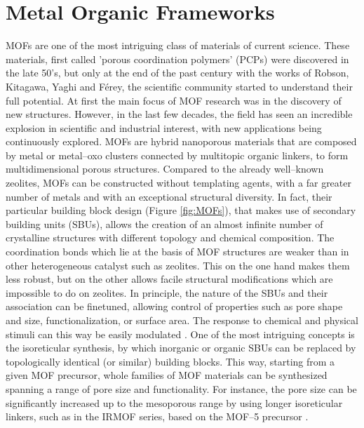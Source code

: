 \section{Metal Organic Frameworks}
MOFs are one of the most intriguing class of materials of current science. These materials, first called 'porous coordination polymers' (PCPs) were discovered in the late 50's, but only at the end of the past century with the works of Robson\cite{batten1995two,hoskins1990design}, Kitagawa\cite{kitagawa1991synthesis, kitagawa1993synthesis}, Yaghi\cite{yaghi1995hydrothermal} and F\'{e}rey\cite{riou1998hybrid}, the scientific community started to understand their full potential. At first the main focus of MOF research was in the discovery of new structures. However, in the last few decades, the field has seen an incredible explosion in scientific and industrial interest, with new applications being continuously explored\cite{furukawa2013chemistry}. MOFs are hybrid nanoporous materials that are composed by metal or metal--oxo clusters connected by multitopic organic linkers, to form multidimensional porous structures. Compared to the already well--known zeolites, MOFs can be constructed without templating agents, with a far greater number of metals and with an exceptional structural diversity. In fact, their particular building block design (Figure \ref{fig:MOFs}), that makes use of secondary building units (SBUs), allows the creation of an almost infinite number of crystalline structures with different topology and chemical composition. 
\npar
The coordination bonds which lie at the basis of MOF structures are weaker than in other heterogeneous catalyst such as zeolites. This on the one hand makes them less robust, but on the other allows facile structural modifications which are impossible to do on zeolites. In principle, the nature of the SBUs and their association can be finetuned\cite{stock2011synthesis}, allowing control of properties such as pore shape and size, functionalization, or surface area. The response to chemical and physical stimuli can this way be easily modulated \cite{zhou2014metal,zhou2012introduction}. 
One of the most intriguing concepts is the isoreticular synthesis, by which inorganic or organic SBUs can be replaced by topologically identical (or similar) building blocks. This way, starting from a given MOF precursor, whole families of MOF materials can be synthesized spanning a range of pore size and functionality. For instance, the pore size can be significantly increased up to the mesoporous range by using longer isoreticular linkers, such as in the IRMOF series, based on the MOF--5 precursor \cite{eddaoudi2002systematic}. 
